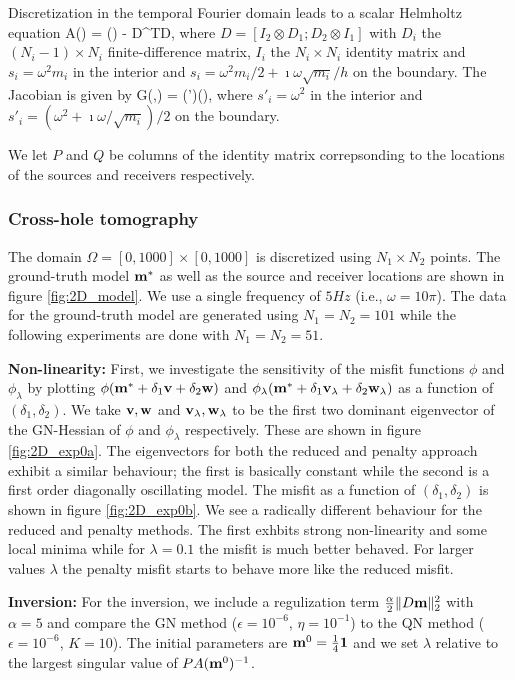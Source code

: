 \documentclass{iopart}
\begin{document}
Discretization in the temporal Fourier domain leads to a scalar Helmholtz equation
\bq
A() = () - D^TD,
\eq
where $D = [I_2\otimes D_1; D_2\otimes I_1]$ with $D_i$ the $(N_i-1)\times N_i$ finite-difference matrix, $I_i$ the $N_i\times N_i$ identity matrix
and $s_i = \omega^2 m_i$ in the interior and $s_i = \omega^2 m_i/2 + \imath\omega\sqrt{m_i}/h$ on the boundary.
The Jacobian is given by
\bq
G(,) = (')(),
\eq
where $s'_i = \omega^2$ in the interior and $s'_i = (\omega^2 + \imath\omega/\sqrt{m_i})/2$ on the boundary.

We let $P$ and $Q$ be columns of the identity matrix correpsonding
to the locations of the sources and receivers respectively.
\subsubsection{Cross-hole tomography}
The domain $\Omega = [0,1000]\times [0,1000]$ is discretized using $N_1\times N_2$ points. 
The ground-truth model $\mathbf{m}^*$ as well as the source and receiver locations are shown in figure  \ref{fig:2D_model}. We use a single frequency
of $5 Hz$ (i.e., $\omega = 10\pi$).
The data for the ground-truth model are generated using $N_1=N_2=101$ while the following experiments are done with $N_1=N_2=51$.

\textbf{Non-linearity:}
First, we investigate the sensitivity of the misfit functions $\phi$ and $\phi_{\lambda}$ by plotting $\phi(\mathbf{m}^* + \delta_1 \mathbf{v} + \delta_2\mathbf{w})$ and
$\phi_{\lambda}(\mathbf{m}^* + \delta_1 \mathbf{v}_{\lambda} + \delta_2\mathbf{w}_{\lambda})$ as a function of $(\delta_1,\delta_2)$. 
We take $\mathbf{v}, \mathbf{w}$ and $\mathbf{v}_{\lambda}, \mathbf{w}_{\lambda}$ to be the first two dominant eigenvector of the GN-Hessian of 
$\phi$ and $\phi_{\lambda}$ respectively. These are shown in figure \ref{fig:2D_exp0a}. The eigenvectors for both the reduced and penalty
approach exhibit a similar behaviour; the first is basically constant while the second is a first order diagonally oscillating model.
The misfit as a function of $(\delta_1,\delta_2)$ is shown in figure \ref{fig:2D_exp0b}. We see a radically different behaviour for the reduced and penalty methods.
The first exhbits strong non-linearity and some local minima while for $\lambda=0.1$ the misfit is much better behaved. For larger values $\lambda$ the penalty misfit
starts to behave more like the reduced misfit.

\textbf{Inversion:}
For the inversion, we include a regulization term $\frac{\alpha}{2} \|D\mathbf{m}\|_2^2$ with $\alpha = 5$ and compare 
the GN method ($\epsilon=10^{-6}$, $\eta=10^{-1}$) to the QN method ($\epsilon=10^{-6}$, $K=10$).
The initial parameters are $\mathbf{m}^0 = \frac{1}{4}\mathbf{1}$ and we set $\lambda$ relative to the largest singular value of $PA(\mathbf{m}^0)^{-1}$.
\end{document}
